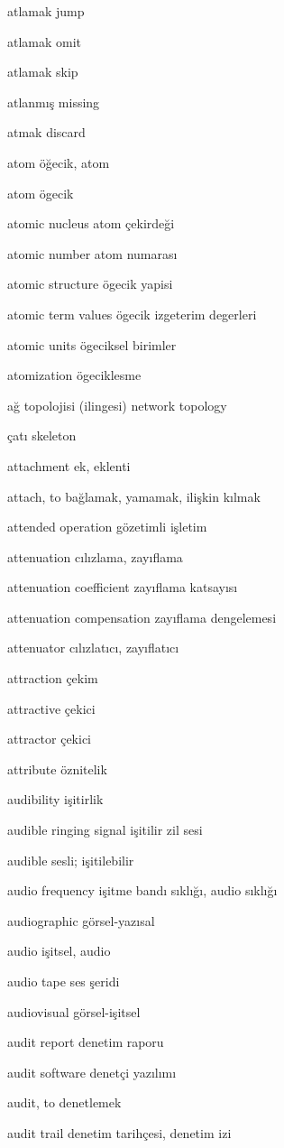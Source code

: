 \documentclass[12pt,fleqn]{article}\usepackage{../../common}
\begin{document}
atlamak jump

atlamak omit

atlamak skip

atlanmış missing

atmak discard

atom öğecik, atom

atom ögecik

atomic nucleus atom çekirdeği

atomic number atom numarası

atomic structure ögecik yapisi

atomic term values ögecik izgeterim degerleri

atomic units ögeciksel birimler

atomization ögeciklesme

ağ topolojisi (ilingesi) network topology

çatı skeleton

attachment ek, eklenti

attach, to bağlamak, yamamak, ilişkin kılmak

attended operation gözetimli işletim

attenuation cılızlama, zayıflama

attenuation coefficient zayıflama katsayısı

attenuation compensation zayıflama dengelemesi

attenuator cılızlatıcı, zayıflatıcı

attraction çekim

attractive çekici

attractor çekici

attribute öznitelik

audibility işitirlik

audible ringing signal işitilir zil sesi

audible sesli; işitilebilir

audio frequency işitme bandı sıklığı, audio sıklığı

audiographic görsel-yazısal

audio işitsel, audio

audio tape ses şeridi

audiovisual görsel-işitsel

audit report denetim raporu

audit software denetçi yazılımı

audit, to denetlemek

audit trail denetim tarihçesi, denetim izi
\end{document}
